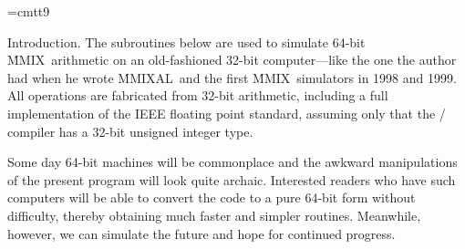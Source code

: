 

\def\topofcontents{
  \leftline{\sc\today\ at \hours}\bigskip\bigskip
  \centerline{\titlefont\title}}

\font\ninett=cmtt9
\def\botofcontents{\vskip 0pt plus 1filll
    \ninerm\baselineskip10pt
    \noindent\copyright\ 1999 Donald E. Knuth
    \bigskip\noindent
    This file may be freely copied and distributed, provided that
    no changes whatsoever are made. All users are asked to help keep
    the {\ninett MMIX}ware files consistent and ``uncorrupted,''
    identical everywhere in the world. Changes are permissible only
    if the modified file is given a new name, different from the names of
    existing files in the {\ninett MMIX}ware package,
    and only if the modified file is clearly identified
    as not being part of that package.
    (The {\ninett CWEB} system has a ``change file'' facility by
    which users can easily make minor alterations without modifying
    the master source files in any way. Everybody is supposed to use
    change files instead of changing the files.)
    The author has tried his best to produce correct and useful programs,
    in order to help promote computer science research,
    but no warranty of any kind should be assumed.}


\def\title{MMIX-ARITH}

\def\MMIX{\.{MMIX}}
\def\MMIXAL{\.{MMIXAL}}
\def\Hex#1{\hbox{$^{\scriptscriptstyle\#}$\tt#1}} %
\def\dts{\mathinner{\ldotp\ldotp}}
\def\<#1>{\hbox{$\langle\,$#1$\,\rangle$}}\let\is=\longrightarrow
\def\ff{\\{ff\kern-.05em}}




Introduction. The subroutines below are used to simulate 64-bit \MMIX\
arithmetic on an old-fashioned 32-bit computer---like the one the author
had when he wrote \MMIXAL\ and the first \MMIX\ simulators in 1998 and 1999.
All operations are fabricated from 32-bit arithmetic, including
a full implementation of the IEEE floating point standard,
assuming only that the \CEE/ compiler has a 32-bit unsigned integer type.

Some day 64-bit machines will be commonplace and the awkward manipulations of
the present program will look quite archaic. Interested readers who have such
computers will be able to convert the code to a pure 64-bit form without
difficulty, thereby obtaining much faster and simpler routines. Meanwhile,
however, we can simulate the future and hope for continued progress.

